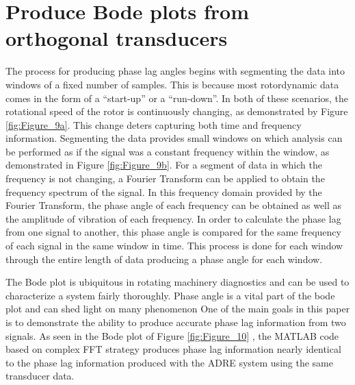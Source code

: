 	\section{Produce Bode plots from orthogonal transducers }
		The process for producing phase lag angles begins with segmenting the data into windows of a fixed number of samples. This is because most rotordynamic data comes in the form of a “start-up” or a “run-down”. In both of these scenarios, the rotational speed of the rotor is continuously changing, as demonstrated by Figure \ref{fig:Figure_9a}. This change deters capturing both time and frequency information. Segmenting the data provides small windows on which analysis can be performed as if the signal was a constant frequency within the window, as demonstrated in Figure \ref{fig:Figure_9b}. For a segment of data in which the frequency is not changing, a Fourier Transform can be applied to obtain the frequency spectrum of the signal. In this frequency domain provided by the Fourier Transform, the phase angle of each frequency can be obtained as well as the amplitude of vibration of each frequency. In order to calculate the phase lag from one signal to another, this phase angle is compared for the same frequency of each signal in the same window in time. This process is done for each window through the entire length of data producing a phase angle for each window.\par 
		The Bode plot is ubiquitous in rotating machinery diagnostics and can be used to characterize a system fairly thoroughly. Phase angle is a vital part of the bode plot and can shed light on many phenomenon One of the main goals in this paper is to demonstrate the ability to produce accurate phase lag information from two signals. As seen in the Bode plot of Figure \ref{fig:Figure_10} , the MATLAB code based on complex FFT strategy produces phase lag information nearly identical to the phase lag information produced with the ADRE system using the same transducer data.\par 
